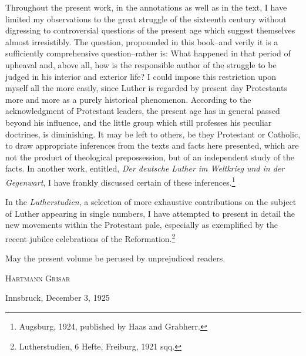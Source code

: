 Throughout the present work, in the annotations as well as in the text,
I have limited my observations to the great struggle of the sixteenth century
without digressing to controversial questions of the
present age which suggest themselves almost irresistibly. The question,
propounded in this book--and verily it is a sufficiently comprehensive question--rather is:
What happened in that period of upheaval
and, above all, how is the responsible author of the struggle to be
judged in his interior and exterior life? I could impose this restriction
upon myself all the more easily, since Luther is regarded by present day
Protestants more and more as a purely historical phenomenon.
According to the acknowledgment of Protestant leaders, the present
age has in general passed beyond his influence, and the little group
which still professes his peculiar doctrines, is diminishing. It may be
left to others, be they Protestant or Catholic, to draw appropriate inferences from the texts and facts here presented, which are not the
product of theological prepossession, but of an independent study of
the facts. In another work, entitled, \textit{Der deutsche Luther im Weltkrieg und in der Gegenwart}, I have frankly discussed certain of these inferences.\footnote{Augsburg, 1924, published by Haas and Grabherr.}

In the \textit{Lutherstudien}, a selection of more exhaustive contributions on the subject of Luther appearing in single numbers, I have attempted to present in detail the new movements within the Protestant pale, especially as exemplified by the recent jubilee celebrations of
the Reformation.\footnote{Lutherstudien, 6 Hefte, Freiburg, 1921 sqq.}

May the present volume be perused by unprejudiced readers.

\hfill \textsc{Hartmann Grisar}

\begin{flushleft}
Innsbruck, December 3, 1925
\end{flushleft}
